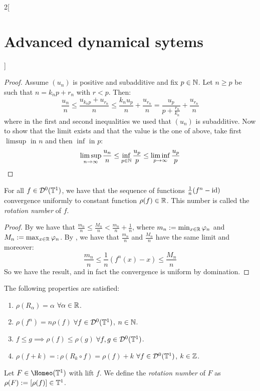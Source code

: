 \documentclass[../../../main_math.tex]{subfiles}
\begin{document}
\begin{multicols}{2}[\section{Advanced dynamical sytems}]
\begin{lemma}
  \end{lemma}
  \begin{proof}
    Assume $(u_n)$ is positive and subadditive and fix $p\in\mathbb{N}$. Let $n\geq p$ be such that $n=k_np+r_n$ with $r<p$. Then:
    $$
      \frac{u_n}{n}\leq \frac{u_{k_np}+u_{r_n}}{n}\leq \frac{k_nu_p}{n}+\frac{u_{r_n}}{n}=\frac{u_p}{p+\frac{r_n}{k_n}}+\frac{u_{r_n}}{n}
    $$
    where in the first and second inequalities we used that $(u_n)$ is subadditive. Now to show that the limit exists and that the value is the one of above, take first $\limsup$ in $n$ and then $\inf$ in $p$:
    $$
      \limsup_{n\to\infty}\frac{u_n}{n}\leq \inf_{p\in\mathbb{N}}\frac{u_p}{p}\leq \liminf_{p\to\infty}\frac{u_p}{p}
    $$
  \end{proof}
  \begin{theorem}
    For all $f\in \mathcal{D}^0(\mathbb{T}^1)$, we have that the sequence of functions $\frac{1}{n}(f^n-\mathrm{id})$ convergence uniformly to constant function $\rho(f)\in\mathbb{R}$. This number is called the \emph{rotation number} of $f$.
  \end{theorem}
  \begin{proof}
    By  we have that $\frac{m_n}{n}\leq \frac{M_n}{n}< \frac{m_n}{n}+\frac{1}{n}$, where $m_n:= \min_{x\in\mathbb{R}}\varphi_n$ and $M_n:= \max_{x\in\mathbb{R}}\varphi_n$. By , we have that $\frac{m_n}{n}$ and $\frac{M_n}{n}$ have the same limit and moreover:
    $$
      \frac{m_n}{n}\leq \frac{1}{n}(f^n(x)-x)\leq \frac{M_n}{n}
    $$
    So we have the result, and in fact the convergence is uniform by domination.
  \end{proof}
  \begin{proposition}
    The following properties are satisfied:
    \begin{enumerate}
      \item $\rho(R_\alpha)=\alpha$ $\forall\alpha\in\mathbb{R}$.
      \item $\rho(f^n)=n\rho(f)$ $\forall f\in \mathcal{D}^0(\mathbb{T}^1)$, $n\in\mathbb{N}$.
      \item $f\leq g\implies \rho(f)\leq \rho(g)$ $\forall f,g\in \mathcal{D}^0(\mathbb{T}^1)$.
      \item $\rho(f+k)=:\rho(R_k\circ f)=\rho(f) + k$ $\forall f\in \mathcal{D}^0(\mathbb{T}^1)$, $k\in\mathbb{Z}$.
    \end{enumerate}
  \end{proposition}
  \begin{definition}
    Let $F\in \Homeo(\TT^1)$ with lift $f$. We define the \emph{rotation number} of $F$ as $\rho(F):=[\rho(f)]\in \mathbb{T}^1$.

\end{definition}
\end{multicols}
\end{document}
